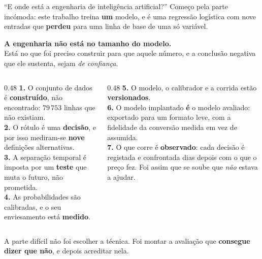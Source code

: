 \documentclass[aspectratio=169]{beamer}
\begin{document}
\begin{frame}{``E onde está a engenharia de inteligência artificial?''}
\small
Começo pela parte incómoda: este trabalho treina \textbf{um} modelo, e é uma regressão
logística com nove entradas que \textbf{perdeu} para uma linha de base de uma só variável.
\vspace{2mm}

\begin{center}
\textbf{A engenharia não está no tamanho do modelo.}\\
Está no que foi preciso construir para que aquele número, e a conclusão negativa
que ele sustenta, sejam \emph{de confiança}.
\end{center}
\vspace{2mm}

\begin{columns}[T]
\begin{column}{0.48\textwidth}
{\footnotesize
\textbf{1.} O conjunto de dados é \textbf{construído}, não encontrado: $79\,753$ linhas que não
existiam.\\[1mm]
\textbf{2.} O rótulo é uma \textbf{decisão}, e por isso mediram-se \textbf{nove} definições
alternativas.\\[1mm]
\textbf{3.} A separação temporal é imposta por um \textbf{teste} que muta o futuro, não
prometida.\\[1mm]
\textbf{4.} As probabilidades são calibradas, e o seu enviesamento está \textbf{medido}.
}
\end{column}
\begin{column}{0.48\textwidth}
{\footnotesize
\textbf{5.} O modelo, o calibrador e a corrida estão \textbf{versionados}.\\[1mm]
\textbf{6.} O modelo implantado \textbf{é} o modelo avaliado: exportado para um formato leve,
com a fidelidade da conversão medida em vez de assumida.\\[1mm]
\textbf{7.} O que corre é \textbf{observado}: cada decisão é registada e confrontada dias
depois com o que o preço fez. Foi assim que se soube que \emph{não} estava a ajudar.
}
\end{column}
\end{columns}
\vspace{0.5mm}

\begin{center}
\footnotesize A parte difícil não foi escolher a técnica. Foi montar a avaliação que
\textbf{consegue dizer que não}, e depois acreditar nela.
\end{center}
\end{frame}
\end{document}
